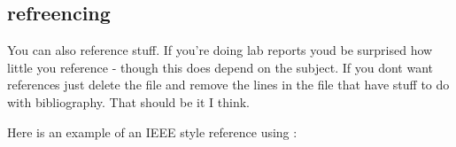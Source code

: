 \subsection{refreencing}

You can also reference stuff. If you're doing lab reports youd be surprised how little you reference - though this does depend on the subject. If you dont want references just delete the  file and remove the lines in the  file that have stuff to do with bibliography. That should be it I think.

Here is an example of an IEEE style reference using : \cite{normal_distribution_wiki_page}


